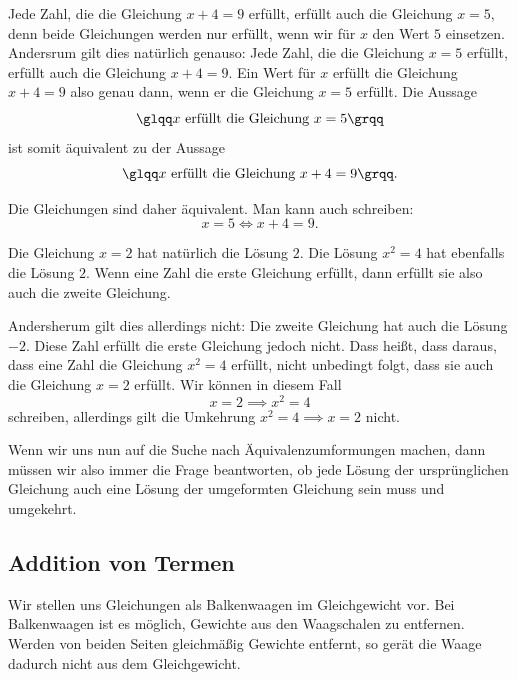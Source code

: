 \documentclass[../../main.tex]{subfiles}
\begin{document}
\begin{example}{}
    Jede Zahl, die die Gleichung $x+4=9$ erfüllt, erfüllt auch die Gleichung $x=5$, denn beide Gleichungen werden nur erfüllt, wenn wir für $x$ den Wert $5$ einsetzen. Andersrum gilt dies natürlich genauso: Jede Zahl, die die Gleichung $x=5$ erfüllt, erfüllt auch die Gleichung $x+4=9$. Ein Wert für $x$ erfüllt die Gleichung $x+4=9$ also genau dann, wenn er die Gleichung $x=5$ erfüllt. Die Aussage 
    \[\glqq x\text{ erfüllt die Gleichung }x=5\grqq\] 
    ist somit äquivalent zu der Aussage 
    \[\glqq x\text{ erfüllt die Gleichung }x+4=9\grqq.\]
    
    Die Gleichungen sind daher äquivalent. Man kann auch schreiben:
    \[x=5\iff x+4=9.\]
\end{example}
\begin{example}{}
    Die Gleichung $x=2$ hat natürlich die Lösung $2$. Die Lösung $x^2=4$ hat ebenfalls die Lösung $2$. Wenn eine Zahl die erste Gleichung erfüllt, dann erfüllt sie also auch die zweite Gleichung.
    
    Andersherum gilt dies allerdings nicht: Die zweite Gleichung hat auch die Lösung $-2$. Diese Zahl erfüllt die erste Gleichung jedoch nicht. Dass heißt, dass daraus, dass eine Zahl die Gleichung $x^2=4$ erfüllt, nicht unbedingt folgt, dass sie auch die Gleichung $x=2$ erfüllt. Wir können in diesem Fall
    \[x=2\implies x^2=4\]
    schreiben, allerdings gilt die Umkehrung $x^2=4 \implies x=2$ nicht.
\end{example}
Wenn wir uns nun auf die Suche nach Äquivalenzumformungen machen, dann müssen wir also immer die Frage beantworten, ob jede Lösung der ursprünglichen Gleichung auch eine Lösung der umgeformten Gleichung sein muss und umgekehrt.

\subsection{Addition von Termen}

Wir stellen uns Gleichungen als Balkenwaagen im Gleichgewicht vor. Bei Balkenwaagen ist es möglich, Gewichte aus den Waagschalen zu entfernen. Werden von beiden Seiten gleichmäßig Gewichte entfernt, so gerät die Waage dadurch nicht aus dem Gleichgewicht.
\end{document}
